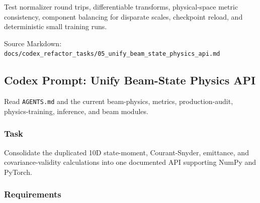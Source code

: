 \documentclass[
]{article}
\begin{document}
Test normalizer round trips, differentiable transforms, physical-space
metric consistency, component balancing for disparate scales, checkpoint
reload, and deterministic small training runs.

Source Markdown:
\texttt{docs/codex\_refactor\_tasks/05\_unify\_beam\_state\_physics\_api.md}

\hypertarget{codex-prompt-unify-beam-state-physics-api}{%
\subsection{Codex Prompt: Unify Beam-State Physics
API}\label{codex-prompt-unify-beam-state-physics-api}}

Read \texttt{AGENTS.md} and the current beam-physics, metrics,
production-audit, physics-training, inference, and beam modules.

\hypertarget{task-4}{%
\subsubsection{Task}\label{task-4}}

Consolidate the duplicated 10D state-moment, Courant-Snyder, emittance,
and covariance-validity calculations into one documented API supporting
NumPy and PyTorch.

\hypertarget{requirements-4}{%
\subsubsection{Requirements}\label{requirements-4}}
\end{document}
